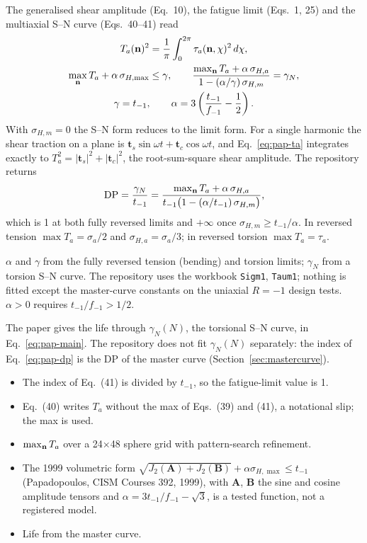  The generalised shear amplitude (Eq.~10), the fatigue limit (Eqs.~1, 25) and the
multiaxial S--N curve (Eqs.~40--41) read
\begin{gather}
T_a(\mathbf n)^2=\frac1\pi\int_0^{2\pi}\tau_a(\mathbf n,\chi)^2\,d\chi ,
\label{eq:pap-ta}\\
\max_{\mathbf n}T_a+\alpha\,\sigma_{H,\max}\le\gamma ,\qquad
\frac{\max_{\mathbf n}T_a+\alpha\,\sigma_{H,a}}{1-(\alpha/\gamma)\,\sigma_{H,m}}=\gamma_N ,
\label{eq:pap-main}\\
\gamma=t_{-1},\qquad \alpha=3\left(\frac{t_{-1}}{f_{-1}}-\frac12\right).
\label{eq:pap-const}
\end{gather}
With $\sigma_{H,m}=0$ the S--N form reduces to the limit form. For a single harmonic the shear
traction on a plane is $\mathbf t_s\sin\omega t+\mathbf t_c\cos\omega t$, and Eq.~\eqref{eq:pap-ta}
integrates exactly to $T_a^2=|\mathbf t_s|^2+|\mathbf t_c|^2$, the root-sum-square shear amplitude.
The repository returns
\begin{equation}
\mathrm{DP}=\frac{\gamma_N}{t_{-1}}=
\frac{\max_{\mathbf n}T_a+\alpha\,\sigma_{H,a}}{t_{-1}\bigl(1-(\alpha/t_{-1})\,\sigma_{H,m}\bigr)} ,
\label{eq:pap-dp}
\end{equation}
which is 1 at both fully reversed limits and $+\infty$ once $\sigma_{H,m}\ge t_{-1}/\alpha$. In
reversed tension $\max T_a=\sigma_a/2$ and $\sigma_{H,a}=\sigma_a/3$; in reversed torsion
$\max T_a=\tau_a$.

 $\alpha$ and $\gamma$ from the fully reversed tension (bending) and
torsion limits; $\gamma_N$ from a torsion S--N curve. The repository uses the workbook
\texttt{Sigm1}, \texttt{Taum1}; nothing is fitted except the master-curve constants on the uniaxial
$R=-1$ design tests. $\alpha>0$ requires $t_{-1}/f_{-1}>1/2$.

 The paper gives the life through $\gamma_N(N)$, the torsional S--N curve, in
Eq.~\eqref{eq:pap-main}. The repository does not fit $\gamma_N(N)$ separately: the index of
Eq.~\eqref{eq:pap-dp} is the DP of the master curve (Section~\ref{sec:mastercurve}).

\begin{itemize}
\item The index of Eq.~(41) is divided by $t_{-1}$, so the fatigue-limit value is 1.
\item Eq.~(40) writes $T_a$ without the max of Eqs.~(39) and (41), a notational slip; the max is used.
\item $\max_{\mathbf n}T_a$ over a 24$\times$48 sphere grid with pattern-search refinement.
\item The 1999 volumetric form $\sqrt{J_2(\mathbf A)+J_2(\mathbf B)}+\alpha\sigma_{H,\max}\le t_{-1}$
  (Papadopoulos, CISM Courses 392, 1999), with $\mathbf A$, $\mathbf B$ the sine and cosine amplitude
  tensors and $\alpha=3t_{-1}/f_{-1}-\sqrt3$, is a tested function, not a registered model.
\item Life from the master curve.
\end{itemize}

